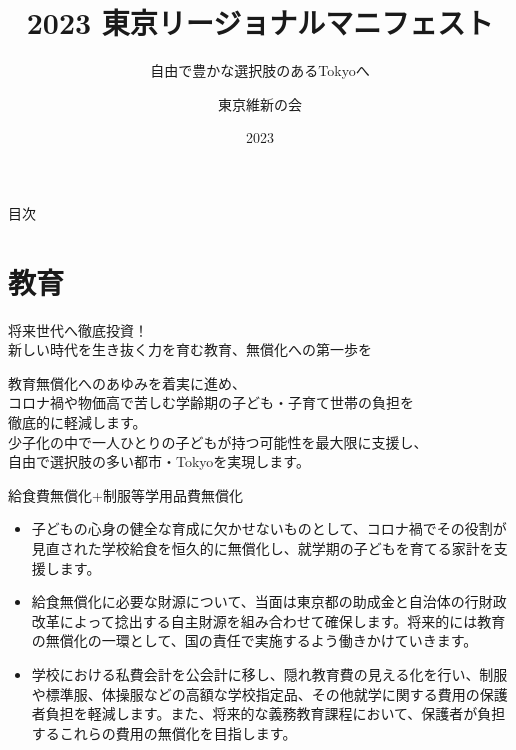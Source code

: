 \documentclass[dvipdfmx]{beamer}
\title{2023 東京リージョナルマニフェスト}
\subtitle{自由で豊かな選択肢のあるTokyoへ}
\author[東京維新の会]{東京維新の会}
\date[2023]{2023}
\begin{document}
\maketitle

\begin{frame}{目次}
    \tableofcontents
\end{frame}

\section{教育}
    \begin{frame}
        \sectionpage
        \begin{center}
            \begin{large}
                \alert{将来世代へ徹底投資！}\\\alert{新しい時代を生き抜く力を育む教育、無償化への第一歩を}
            \end{large}
        \end{center}
        \begin{small}
            教育無償化へのあゆみを着実に進め、\\
            コロナ禍や物価高で苦しむ学齢期の子ども・子育て世帯の負担を\\
            徹底的に軽減します。\\
            少子化の中で一人ひとりの子どもが持つ可能性を最大限に支援し、\\
            自由で選択肢の多い都市・Tokyoを実現します。
        \end{small}
    \end{frame}
    
    \begin{frame}{給食費無償化+制服等学用品費無償化}
        \begin{small}
            \begin{itemize}
                \setlength{\itemsep}{2mm}
                \item 子どもの心身の健全な育成に欠かせないものとして、コロナ禍でその役割が見直された学校給食を恒久的に無償化し、就学期の子どもを育てる家計を支援します。
                \item 給食無償化に必要な財源について、当面は東京都の助成金と自治体の行財政改革によって捻出する自主財源を組み合わせて確保します。将来的には教育の無償化の一環として、国の責任で実施するよう働きかけていきます。
                \item 学校における私費会計を公会計に移し、隠れ教育費の見える化を行い、制服や標準服、体操服などの高額な学校指定品、その他就学に関する費用の保護者負担を軽減します。また、将来的な義務教育課程において、保護者が負担するこれらの費用の無償化を目指します。
            \end{itemize}
        \end{small}
    \end{frame}
\end{document}
